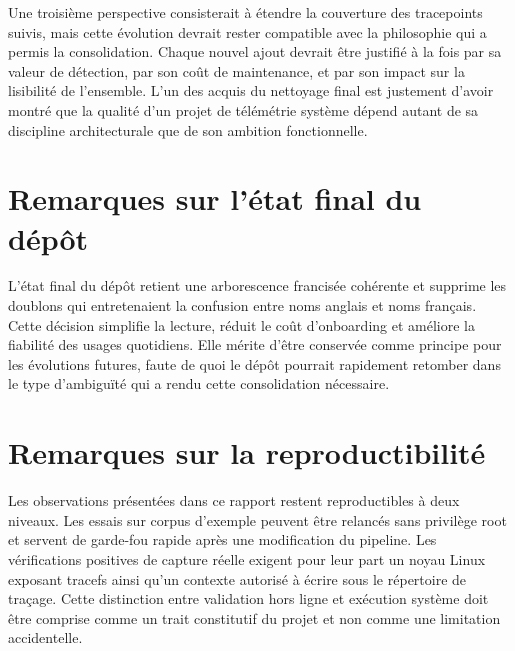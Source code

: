 \documentclass[12pt,a4paper]{report}
\begin{document}
Une troisième perspective consisterait à étendre la couverture des tracepoints suivis, mais cette évolution devrait rester compatible avec la philosophie qui a permis la consolidation. Chaque nouvel ajout devrait être justifié à la fois par sa valeur de détection, par son coût de maintenance, et par son impact sur la lisibilité de l’ensemble. L’un des acquis du nettoyage final est justement d’avoir montré que la qualité d’un projet de télémétrie système dépend autant de sa discipline architecturale que de son ambition fonctionnelle.

\appendix

\chapter{Remarques sur l’état final du dépôt}
L’état final du dépôt retient une arborescence francisée cohérente et supprime les doublons qui entretenaient la confusion entre noms anglais et noms français. Cette décision simplifie la lecture, réduit le coût d’onboarding et améliore la fiabilité des usages quotidiens. Elle mérite d’être conservée comme principe pour les évolutions futures, faute de quoi le dépôt pourrait rapidement retomber dans le type d’ambiguïté qui a rendu cette consolidation nécessaire.

\chapter{Remarques sur la reproductibilité}
Les observations présentées dans ce rapport restent reproductibles à deux niveaux. Les essais sur corpus d’exemple peuvent être relancés sans privilège root et servent de garde-fou rapide après une modification du pipeline. Les vérifications positives de capture réelle exigent pour leur part un noyau Linux exposant tracefs ainsi qu’un contexte autorisé à écrire sous le répertoire de traçage. Cette distinction entre validation hors ligne et exécution système doit être comprise comme un trait constitutif du projet et non comme une limitation accidentelle.
\end{document}
